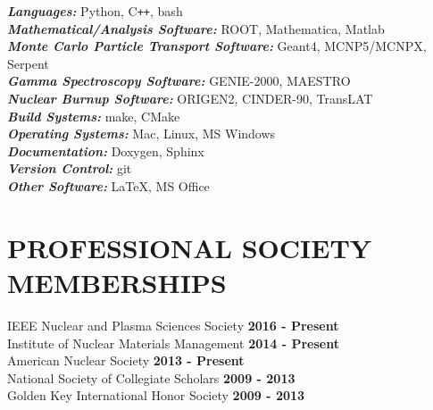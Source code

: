 \documentclass[margin, 10pt]{style/res} %
\begin{document}
\begin{resume}
{\sl\bf Languages:} \hfill Python, C\verb!++!, bash\\
{\sl\bf Mathematical/Analysis Software:} \hfill ROOT, Mathematica, Matlab\\ %
{\sl\bf Monte Carlo Particle Transport Software:} \hfill Geant4, MCNP5/MCNPX, Serpent\\
{\sl\bf Gamma Spectroscopy Software:} \hfill GENIE-2000, MAESTRO\\
{\sl\bf Nuclear Burnup Software:} \hfill ORIGEN2, CINDER-90, TransLAT\\
{\sl\bf Build Systems:} \hfill make, CMake\\
{\sl\bf Operating Systems:} \hfill Mac, Linux, MS Windows\\
{\sl\bf Documentation:} \hfill Doxygen, Sphinx\\
{\sl\bf Version Control:} \hfill git\\
{\sl\bf Other Software:} \hfill \LaTeX, MS Office






\section{\small{PROFESSIONAL SOCIETY MEMBERSHIPS}}

IEEE Nuclear and Plasma Sciences Society \hfill  {\bf 2016 - Present}\\
Institute of Nuclear Materials Management \hfill  {\bf 2014 - Present}\\
American Nuclear Society \hfill {\bf 2013 - Present}\\
National Society of Collegiate Scholars \hfill  {\bf 2009 - 2013}\\
Golden Key International Honor Society \hfill  {\bf 2009 - 2013}





\end{resume}
\end{document}
